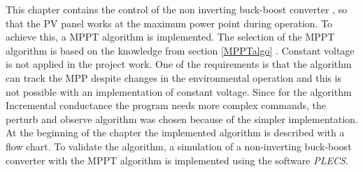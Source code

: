 This chapter contains the control of the non inverting buck-boost converter , so that the PV panel works at the maximum power point during operation. To achieve this, a MPPT algorithm is implemented.
The selection of the MPPT algorithm is based on the knowledge from section  \ref{MPPTalgo} .
Constant voltage is not applied in the project work. One of the requirements is that the algorithm can track the MPP despite changes in the environmental operation and this is not possible with an implementation of constant voltage. Since for the algorithm Incremental conductance the program needs more complex commands, the perturb and observe algorithm was chosen because of the simpler implementation. %
At the beginning of the chapter the implemented algorithm is described with a flow chart. To validate the algorithm, a simulation of a non-inverting buck-boost converter with the MPPT algorithm is implemented using the software \textit{PLECS}. 
